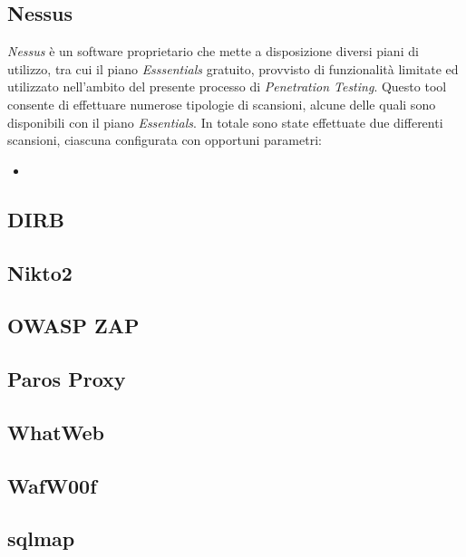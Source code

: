 \subsection{Nessus}
\emph{Nessus} è un software proprietario che mette a disposizione diversi piani di utilizzo, tra cui il piano \emph{Esssentials} gratuito, provvisto di funzionalità limitate ed utilizzato nell'ambito del presente processo di \emph{Penetration Testing}. Questo tool consente di effettuare numerose tipologie di scansioni, alcune delle quali sono disponibili con il piano \emph{Essentials}. In totale sono state effettuate due differenti scansioni, ciascuna configurata con opportuni parametri:
\begin{itemize}
    \item 
\end{itemize}
\subsection{DIRB}
\subsection{Nikto2}
\subsection{OWASP ZAP}
\subsection{Paros Proxy}
\subsection{WhatWeb}
\subsection{WafW00f}
\subsection{sqlmap}
